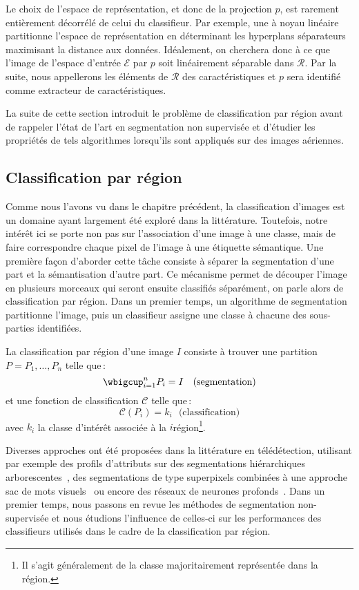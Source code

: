 Le choix de l'espace de représentation, et donc de la projection $p$, est rarement entièrement décorrélé de celui du classifieur. Par exemple, une  à noyau linéaire partitionne l'espace de représentation en déterminant les hyperplans séparateurs maximisant la distance aux données. Idéalement, on cherchera donc à ce que l'image de l'espace d'entrée $\mathcal{E}$ par $p$ soit linéairement séparable dans $\mathcal{R}$. Par la suite, nous appellerons les éléments de $\mathcal{R}$ des caractéristiques et $p$ sera identifié comme extracteur de caractéristiques.

La suite de cette section introduit le problème de classification par région avant de rappeler l'état de l'art en segmentation non supervisée et d'étudier les propriétés de tels algorithmes lorsqu'ils sont appliqués sur des images aériennes.

\subsection{Classification par région}

Comme nous l'avons vu dans le chapitre précédent, la classification d'images est un domaine ayant largement été exploré dans la littérature. Toutefois, notre intérêt ici se porte non pas sur l'association d'une image à une classe, mais de faire correspondre chaque pixel de l'image à une étiquette sémantique. Une première façon d'aborder cette tâche consiste à séparer la segmentation d'une part et la sémantisation d'autre part. Ce mécanisme permet de découper l'image en plusieurs morceaux qui seront ensuite classifiés séparément, on parle alors de classification par région. Dans un premier temps, un algorithme de segmentation partitionne l'image, puis un classifieur assigne une classe à chacune des sous-parties identifiées.
\begin{definition}
La classification par région d'une image $I$ consiste à trouver une partition $P = {P_1, \dots, P_n}$ telle que\,:
$$\wbigcup_{i=1}^n P_i = I~~~\text{(segmentation)}$$
et une fonction de classification $\mathcal{C}$ telle que\,:
$$\mathcal{C}(P_i) = k_i~~~\text{(classification)}$$
avec $k_i$ la classe d'intérêt associée à la $i$\ieme région\footnote{Il s'agit généralement de la classe majoritairement représentée dans la région.}.
\end{definition}

Diverses approches ont été proposées dans la littérature en télédétection, utilisant par exemple des profils d'attributs sur des segmentations hiérarchiques arborescentes~\cite{bosilj_indexation_2016}, des segmentations de type superpixels combinées à une approche sac de mots visuels~\cite{li_superpixel-based_2018} ou encore des réseaux de neurones profonds~\cite{gong_superpixel-based_2017}. Dans un premier temps, nous passons en revue les méthodes de segmentation non-supervisée et nous étudions l'influence de celles-ci sur les performances des classifieurs utilisés dans le cadre de la classification par région.

